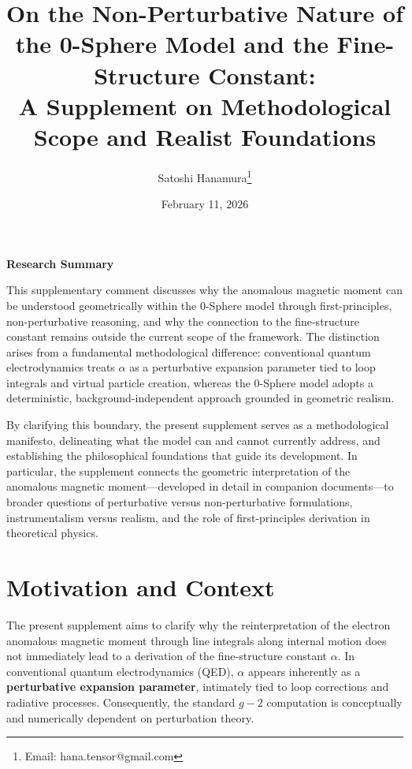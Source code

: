 \documentclass[12pt,letterpaper]{article}
\begin{document}
\title{On the Non-Perturbative Nature of the 0-Sphere Model and the Fine-Structure Constant:\\
\normalsize A Supplement on Methodological Scope and Realist Foundations}

\author{Satoshi Hanamura\thanks{Email: hana.tensor@gmail.com}}
\date{February 11, 2026}

\maketitle

\tableofcontents

\clearpage

\begin{center}
\textbf{Research Summary}
\end{center}

\justifying
This supplementary comment discusses why the anomalous magnetic moment can be understood geometrically within the 0-Sphere model through first-principles, non-perturbative reasoning, and why the connection to the fine-structure constant remains outside the current scope of the framework. The distinction arises from a fundamental methodological difference: conventional quantum electrodynamics treats $\alpha$ as a perturbative expansion parameter tied to loop integrals and virtual particle creation, whereas the 0-Sphere model adopts a deterministic, background-independent approach grounded in geometric realism.

By clarifying this boundary, the present supplement serves as a methodological manifesto, delineating what the model can and cannot currently address, and establishing the philosophical foundations that guide its development. In particular, the supplement connects the geometric interpretation of the anomalous magnetic moment—developed in detail in companion documents—to broader questions of perturbative versus non-perturbative formulations, instrumentalism versus realism, and the role of first-principles derivation in theoretical physics.

\clearpage

\section{Motivation and Context}

The present supplement aims to clarify why the reinterpretation of the electron anomalous magnetic moment through line integrals along internal motion does not immediately lead to a derivation of the fine-structure constant $\alpha$. 
In conventional quantum electrodynamics (QED), $\alpha$ appears inherently as a \textbf{perturbative expansion parameter}, intimately tied to loop corrections and radiative processes. 
Consequently, the standard $g-2$ computation is conceptually and numerically dependent on perturbation theory.
\end{document}

